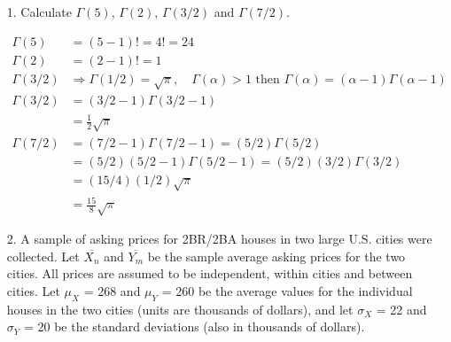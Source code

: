     \begin{itemize}
        \item [1.]
        Calculate $\Gamma(5)$, $\Gamma(2)$, $\Gamma(3/2)$ and $\Gamma(7/2)$.
        \\
        \begin{mdframed}
            \begin{align*}
                \Gamma(5)   & = (5-1)! = 4! = \boxed{24}                            \\
                \Gamma(2)   & = (2-1)! = \boxed{1}                                  \\
                \Gamma(3/2) & \Rightarrow \Gamma(1/2) = \sqrt{\pi}, \quad 
                              \Gamma(\alpha) > 1 \text{ then } \Gamma(\alpha)
                              = (\alpha - 1)\Gamma(\alpha - 1)                      \\
                \Gamma(3/2) & = (3/2 - 1) \Gamma(3/2 - 1)                           \\
                            & = \boxed{\frac{1}{2}\sqrt{\pi}}                       \\
                \Gamma(7/2) & = (7/2-1)\Gamma(7/2-1) = (5/2)\Gamma(5/2)             \\
                            & = (5/2)(5/2-1)\Gamma(5/2-1) = (5/2)(3/2)\Gamma(3/2)   \\
                            & = (15/4)(1/2)\sqrt{\pi}                               \\
                            & = \boxed{\frac{15}{8}\sqrt{\pi}}
            \end{align*}
        \end{mdframed}

        \item[2.]
        A sample of asking prices for 2BR/2BA houses in two large U.S. cities were collected. Let $\overline{X_{n}}$ and $\overline{Y_{m}}$ be the sample average asking prices for the two cities. All prices are assumed to be independent, within cities and between cities. Let $\mu_{X}$ = 268 and $\mu_{Y}$ = 260 be the average values for the individual houses in the two cities (units are thousands of dollars), and let $\sigma_{X}$ = 22 and $\sigma_{Y}$ = 20 be the standard deviations (also in thousands of dollars).


\end{itemize}
